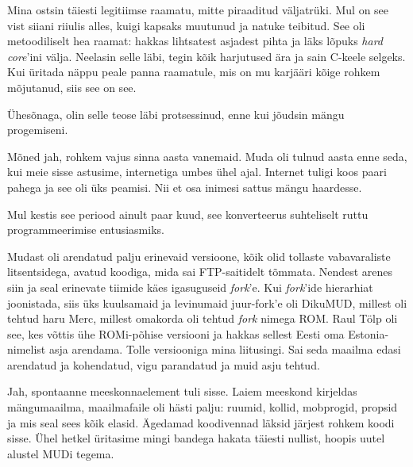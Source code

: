 Mina ostsin täiesti legitiimse raamatu, mitte 
piraaditud väljatrüki. Mul on see vist siiani riiulis alles, kuigi kapsaks 
muutunud ja natuke teibitud. See oli metoodiliselt hea raamat: 
hakkas lihtsatest asjadest pihta ja läks lõpuks \emph{hard core}'ini 
välja. Neelasin selle läbi, tegin kõik harjutused ära ja 
sain C-keele selgeks. Kui üritada näppu peale panna 
raamatule, mis on mu karjääri kõige rohkem mõjutanud, siis see on 
see. 

Ühesõnaga, olin selle teose läbi protsessinud, enne kui jõudsin mängu 
progemiseni.


Mõned jah, rohkem vajus sinna aasta vanemaid. Muda 
oli tulnud aasta enne seda, kui meie sisse astusime, internetiga umbes 
ühel ajal. Internet tuligi koos paari 
pahega ja see oli üks peamisi. Nii et osa inimesi sattus mängu haardesse.


Mul kestis see periood ainult paar kuud, see konverteerus suhteliselt ruttu 
programmeerimise entusiasmiks. 


Mudast oli arendatud palju erinevaid versioone, kõik 
olid tollaste vabavaraliste litsentsidega, avatud koodiga, mida sai 
FTP-saitidelt tõmmata. Nendest arenes siin ja seal erinevate tiimide 
käes igasuguseid \emph{fork}'e. 
Kui \emph{fork}'ide hierarhiat 
joonistada, siis üks kuulsamaid ja levinumaid juur-fork'e oli 
DikuMUD, millest oli tehtud haru Merc, 
millest omakorda oli tehtud \emph{fork} nimega ROM. Raul Tölp 
oli see, kes võttis ühe ROMi-põhise versiooni ja hakkas sellest Eesti 
oma Estonia-nimelist asja arendama. Tolle versiooniga mina liitusingi. Sai seda maailma edasi arendatud ja kohendatud, vigu parandatud ja muid asju tehtud. 


Jah, spontaanne meeskonnaelement tuli sisse. Laiem meeskond kirjeldas
mängumaailma, maailmafaile oli hästi palju: 
ruumid, kollid, mobprogid, propsid ja mis seal sees kõik elasid. 
Ägedamad koodivennad läksid järjest rohkem koodi 
sisse. Ühel hetkel üritasime mingi bandega hakata täiesti nullist, 
hoopis uutel alustel MUDi tegema. 

